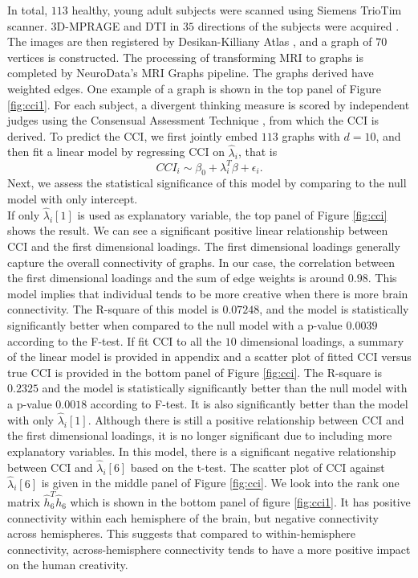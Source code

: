 \documentclass[10pt,journal,compsoc]{IEEEtran}
\begin{document}
\noindent In total, $113$ healthy, young adult subjects were scanned using Siemens TrioTim scanner. 3D-MPRAGE and DTI in $35$ directions of the subjects were acquired \cite{brant1992mp}. The images are then registered by Desikan-Killiany Atlas \cite{desikan2006automated}, and a graph of $70$ vertices is constructed. The processing of transforming MRI to graphs is completed by NeuroData's MRI Graphs pipeline\cite{kiar2016ndmgcode}. The graphs derived have weighted edges. One example of a graph is shown in the top panel of Figure \ref{fig:cci1}. For each subject, a divergent thinking measure is scored by independent judges using the Consensual Assessment Technique \cite{amabile1983social}, from which the CCI is derived. To predict the CCI, we first jointly embed $113$ graphs with $d=10$, and then fit a linear model by regressing CCI on $\hat{\lambda}_i$, that is
\[CCI_i \sim \beta_0+\lambda_i^T\beta + \epsilon_i. \]
Next, we assess the statistical significance of this model by comparing to the null model with only intercept. \\

\noindent If only $\hat{\lambda}_i[1]$ is used as explanatory variable, the top panel of Figure \ref{fig:cci} shows the result. We can see a significant positive linear relationship between CCI and the first dimensional loadings. The first dimensional loadings generally capture the overall connectivity of graphs. In our case, the correlation between the first dimensional loadings and the sum of edge weights is around $0.98$. This model implies that individual tends to be more creative when there is more brain connectivity. The R-square of this model is $0.07248$, and the model is statistically significantly better when compared to the null model with a p-value $0.0039$ according to the F-test. If fit CCI to all the $10$ dimensional loadings, a summary of the linear model is provided in appendix and a scatter plot of fitted CCI versus true CCI is provided in the bottom panel of Figure \ref{fig:cci}. The R-square is $0.2325$ and the model is statistically significantly better than the null model with a p-value $0.0018$ according to F-test. It is also significantly better than the model with only $\hat{\lambda}_i[1]$. Although there is still a positive relationship between CCI and the first dimensional loadings, it is no longer significant due to including more explanatory variables. In this model, there is a significant negative relationship between CCI and $\hat{\lambda}_i[6]$ based on the t-test. The scatter plot of CCI against $\hat{\lambda}_i[6]$ is given in the middle panel of Figure \ref{fig:cci}. We look into the rank one matrix $\hat{h}_6^T\hat{h}_6$ which is shown in the bottom panel of figure \ref{fig:cci1}. It has positive connectivity within each hemisphere of the brain, but negative connectivity across hemispheres. This suggests that compared to within-hemisphere connectivity, across-hemisphere connectivity tends to have a more positive impact on the human creativity. 
\end{document}
